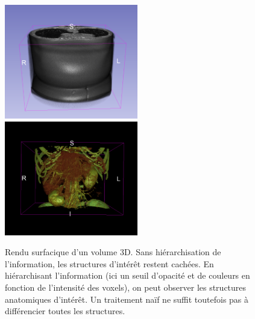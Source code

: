     \begin{figure}[!ht]
      \centering
      \includegraphics[height=5cm]{Images/hierarchy_3D.png}
      \includegraphics[height=5cm]{Images/hierarchy_3D_bis.png}
      \caption{Rendu surfacique d'un volume 3D. Sans hiérarchisation de l'information, les structures d'intérêt restent cachées. En hiérarchisant l'information (ici un seuil d'opacité et de couleurs en fonction de l'intensité des voxels), on peut observer les structures anatomiques d'intérêt. Un traitement naïf ne suffit toutefois pas à différencier toutes les structures.}
      \label{fig:hierachy_3D}
    \end{figure}
